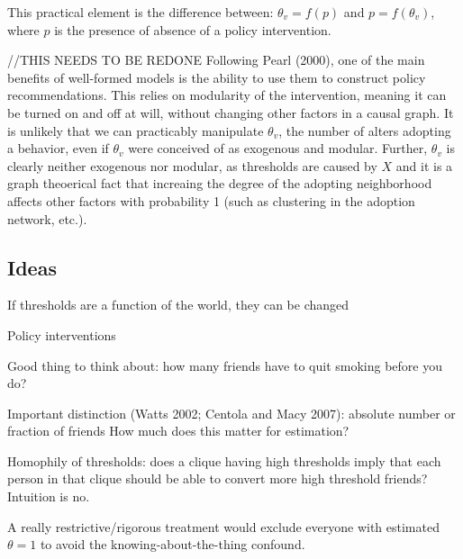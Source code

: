 \documentclass{article}
\begin{document}
This practical element is the difference between:
$\theta_v = f(p)$ and $p = f(\theta_v)$, where $p$ is the presence of absence of a policy intervention.


//THIS NEEDS TO BE REDONE
Following Pearl (2000), one of the main benefits of well-formed models is the ability to use them to construct policy recommendations. This relies on modularity of the intervention, meaning it can be turned on and off at will, without changing other factors in a causal graph. It is unlikely that we can practicably manipulate $\theta_v$, the number of alters adopting a behavior, even if $\theta_v$ were conceived of as exogenous and modular. Further, $\theta_v$ is clearly neither exogenous nor modular, as thresholds are caused by $X$ and it is a graph theoerical fact that increaing the degree of the adopting neighborhood affects other factors with probability 1 (such as clustering in the adoption network, etc.).







\subsection{Ideas}

If thresholds are a function of the world, they can be changed

Policy interventions

Good thing to think about: how many friends have to quit smoking before you do?

Important distinction (Watts 2002; Centola and Macy 2007): absolute number or fraction of friends
How much does this matter for estimation?

Homophily of thresholds: does a clique having high thresholds imply that each person in that clique should be able to convert more high threshold friends? Intuition is no.

A really restrictive/rigorous treatment would exclude everyone with estimated $\theta = 1$ to avoid the knowing-about-the-thing confound.
\end{document}
